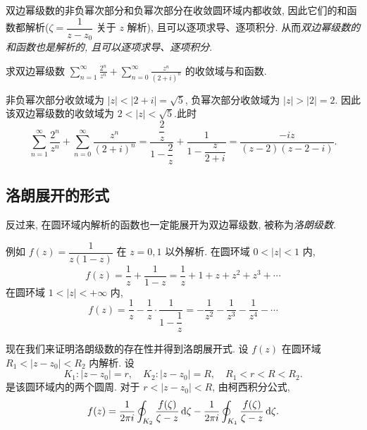 \documentclass[nocolor,theme=doremi,lang=cn,11pt,chinese,twoside,openright,usesamecnt]{elegantbook}
\begin{document}
双边幂级数的非负幂次部分和负幂次部分在收敛圆环域内都收敛,
因此它们的和函数都解析($\zeta=\dfrac1{z-z_0}$ 关于 $z$ 解析), 且可以逐项求导、逐项积分.
从而\emph{双边幂级数的和函数也是解析的, 且可以逐项求导、逐项积分}.

\begin{example}
	求双边幂级数 $\displaystyle\sum_{n=1}^\infty\frac{2^n}{z^n}+\sum_{n=0}^\infty\frac{z^n}{(2+i)^n}$ 的收敛域与和函数.
\end{example}

\begin{solution}
	非负幂次部分收敛域为 $|z|<|2+i|=\sqrt5$, 负幂次部分收敛域为 $|z|>|2|=2$.
	{因此该双边幂级数的收敛域为 $2<|z|<\sqrt5$.此时
		\[\sum_{n=1}^\infty\frac{2^n}{z^n}+\sum_{n=0}^\infty\frac{z^n}{(2+i)^n}
		=\frac{\dfrac 2z}{1-\dfrac 2z}+\frac1{1-\dfrac z{2+i}}
		=\frac{-iz}{(z-2)(z-2-i)}.\]}
\end{solution}

\subsection{洛朗展开的形式}

反过来, 在圆环域内解析的函数也一定能展开为双边幂级数, 被称为\emph{洛朗级数}.

例如 $f(z)=\dfrac1{z(1-z)}$ 在 $z=0,1$ 以外解析.
在圆环域 $0<|z|<1$ 内,
\[f(z)=\frac1z+\frac1{1-z}=\frac1z+1+z+z^2+z^3+\cdots\]
在圆环域 $1<|z|<+\infty$ 内,
\[f(z)=\frac1z-\frac1z\cdot\frac1{1-\dfrac1z}=-\frac1{z^2}-\frac1{z^3}-\frac1{z^4}-\cdots\]

现在我们来证明洛朗级数的存在性并得到洛朗展开式.
设 $f(z)$ 在圆环域 $R_1<|z-z_0|<R_2$ 内解析.
设
	\[K_1:|z-z_0|=r,\quad K_2:|z-z_0|=R,\quad R_1<r<R<R_2.\]
是该圆环域内的两个圆周. 
对于 $r<|z-z_0|<R$, 由柯西积分公式,
\[f(z)=\frac1{2\pi i}
	\oint_{K_2}\frac{f(\zeta)}{\zeta-z}\,\mathrm{d}\zeta
	-\frac1{2\pi i}\oint_{K_1}\frac{f(\zeta)}{\zeta-z}\,\mathrm{d}\zeta.\]

\begin{center}
\end{center}
\end{document}
